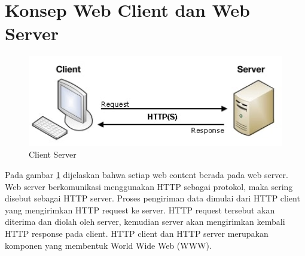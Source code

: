 \section{Konsep Web Client dan Web Server}

\begin{figure}[ht]
\centerline{\includegraphics[width=1\textwidth]{figures/2http.jpg}}
\caption{Client Server}
\label{2http}
\end{figure}

Pada gambar \ref{2http} dijelaskan bahwa setiap web content berada pada web server. Web server berkomunikasi menggunakan HTTP sebagai protokol, maka sering disebut sebagai HTTP server. Proses pengiriman data dimulai dari HTTP client yang mengirimkan HTTP request ke server. HTTP request tersebut akan diterima dan diolah oleh server, kemudian server akan mengirimkan kembali HTTP response pada client. HTTP client dan HTTP server merupakan komponen yang membentuk World Wide Web (WWW).
